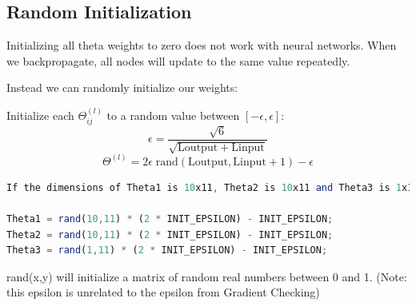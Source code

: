 \documentclass{article}
\begin{document}
\subsection{Random Initialization}
Initializing all theta weights to zero does not work with neural networks. When we backpropagate, all nodes will update to the same value repeatedly.

Instead we can randomly initialize our weights:

Initialize each $\Theta^{(l)}_{ij}$ to a random value between $[-\epsilon,\epsilon]$:
$$\epsilon = \dfrac{\sqrt{6}}{\sqrt{\mathrm{Loutput} + \mathrm{Linput}}}$$
$$\Theta^{(l)} =  2 \epsilon \; \mathrm{rand}(\mathrm{Loutput}, \mathrm{Linput} + 1)    - \epsilon$$

\begin{lstlisting}[language=Octave]
If the dimensions of Theta1 is 10x11, Theta2 is 10x11 and Theta3 is 1x11.

Theta1 = rand(10,11) * (2 * INIT_EPSILON) - INIT_EPSILON;
Theta2 = rand(10,11) * (2 * INIT_EPSILON) - INIT_EPSILON;
Theta3 = rand(1,11) * (2 * INIT_EPSILON) - INIT_EPSILON;
\end{lstlisting}

rand(x,y) will initialize a matrix of random real numbers between 0 and 1. (Note: this epsilon is unrelated to the epsilon from Gradient Checking)
\end{document}
